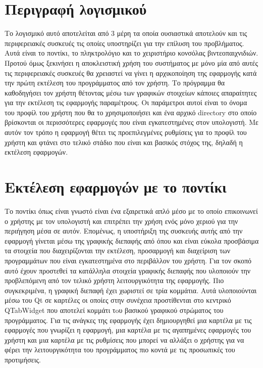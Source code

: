 








\section{Περιγραφή λογισμικού}


Το λογισμικό αυτό αποτελείται από 3 μέρη τα οποία ουσιαστικά αποτελούν και
τις περιφερειακές συσκευές τις οποίες υποστηρίζει για την επίλυση του προβλήματος.
Αυτά είναι το ποντίκι, το πληκτρολόγιο και το χειριστήριο κονσόλας βιντεοπαιχνιδιών.
Προτού όμως ξεκινήσει η αποκλειστική χρήση του συστήματος με μόνο μία από αυτές
τις περιφερειακές συσκευές θα χρειαστεί να γίνει η αρχικοποίηση της εφαρμογής κατά
την πρώτη εκτέλεση του προγράμματος από τον χρήστη. Το πρόγραμμα θα καθοδηγήσει τον
χρήστη θέτοντας μέσω των γραφικών στοιχείων κάποιες απαραίτητες για την εκτέλεση
τις εφαρμογής παραμέτρους. Οι παράμετροι αυτοί είναι το όνομα του προφίλ του χρήστη
που θα το χρησιμοποιήσει και ένα αρχικό directory στο οποίο βρίσκονται οι περισσότερες
εφαρμογές που είναι εγκατεστημένες στον υπολογιστή. Με αυτόν τον τρόπο η εφαρμογή 
θέτει τις προεπιλεγμένες ρυθμίσεις για το προφίλ του χρήστη και φτάνει στο τελικό
στάδιο που είναι και βασικός στόχος της, δηλαδή η εκτέλεση εφαρμογών.

\section{Εκτέλεση εφαρμογών με το ποντίκι}


Το ποντίκι όπως είναι γνωστό είναι ένα εξαιρετικά απλό μέσο με το οποίο επικοινωνεί
ο χρήστης με τον υπολογιστή και επιτρέπει την χρήση ενός μόνο χεριού για την περιήγηση
μέσα σε αυτόν. Επομένως, η υποστήριξη της συσκευής αυτής από την εφαρμογή γίνεται
μέσω της γραφικής διεπαφής από όπου και είναι εύκολα προσβάσιμα τα στοιχεία που
διαχειρίζονται την εκτέλεση, προσαρμογή και διαχείριση των προγραμμάτων που είναι
εγκατεστημένα στο περιβάλλον του χρήστη. Για τον σκοπό αυτό έχουν προστεθεί τα κατάλληλα
στοιχεία γραφικής διεπαφής που υλοποιούν την προβλεπόμενη από τον τελικό χρήστη 
λειτουργικότητα της εφαρμογής. Πιο συγκεκριμένα, η γραφική διεπαφή έχει χωριστεί σε τρία κομμάτια.
Αυτά υλοποιούνται μέσω του Qt σε καρτέλες οι οποίες στην συνέχεια προστίθενται στο
κεντρικό QTabWidget που αποτελεί κομμάτι τoυ βασικού γραφικού στρώματος του προγράμματος.
Για τις ανάγκες της εφαρμογής έχει δημιουργηθεί μια καρτέλα με τις εφαρμογές που γνωρίζει
η εφαρμογή, μια καρτέλα με τις αγαπημένες εφαρμογές του χρήστη και μια καρτέλα με τις
ρυθμίσεις που μπορεί να αλλάξει ο χρήστης για να φέρει την λειτουργικότητα του προγράμματος
πιο κοντά με τις προσωπικές του προτιμήσεις.

